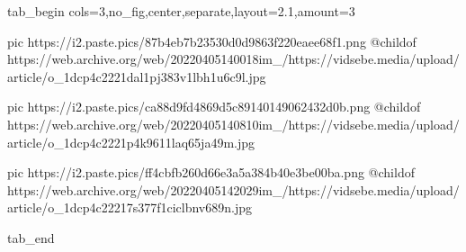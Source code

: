  
 
 
 
 


\ifcmt
  tab_begin cols=3,no_fig,center,separate,layout=2.1,amount=3

	   pic https://i2.paste.pics/87b4eb7b23530d0d9863f220eaee68f1.png
     @childof https://web.archive.org/web/20220405140018im_/https://vidsebe.media/upload/article/o_1dcp4c2221dal1pj383v1lbh1u6c9l.jpg

		 pic https://i2.paste.pics/ca88d9fd4869d5c89140149062432d0b.png
		 @childof https://web.archive.org/web/20220405140810im_/https://vidsebe.media/upload/article/o_1dcp4c2221p4k9611laq65ja49m.jpg

		 pic https://i2.paste.pics/ff4cbfb260d66e3a5a384b40e3be00ba.png
		 @childof https://web.archive.org/web/20220405142029im_/https://vidsebe.media/upload/article/o_1dcp4c22217s377f1ciclbnv689n.jpg

  tab_end
\fi
